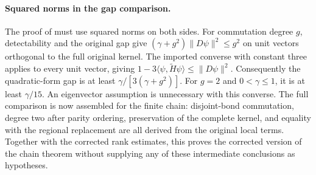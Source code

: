 \documentclass{article}
\begin{document}
\paragraph{Squared norms in the gap comparison.}
The proof of \cite[Theorem~5.14]{Arad2016RigorousRG} must use squared norms on both sides.
For commutation degree $g$, detectability and the original gap give
$(\gamma+g^2)\|D\psi\|^2\le g^2$ on unit vectors orthogonal to the
full original kernel. The imported converse with constant three applies
to every unit vector, giving
$1-3\langle\psi,\widetilde H\psi\rangle\le\|D\psi\|^2$.
Consequently the quadratic-form gap is at least
$\gamma/[3(\gamma+g^2)]$. For $g=2$ and $0<\gamma\le1$, it is at least
$\gamma/15$. An eigenvector assumption is unnecessary with this converse.
The full comparison is now assembled for the finite chain: disjoint-bond
commutation, degree two after parity ordering, preservation of the complete
kernel, and equality with the regional replacement are all derived
from the original local terms. Together with the corrected rank estimates,
this proves the corrected version of the chain theorem without supplying
any of these intermediate conclusions as hypotheses.



\end{document}
